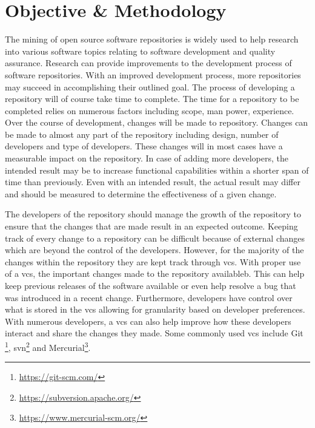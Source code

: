 \section{Objective \& Methodology}

The mining of open source software repositories is widely used to help research into various software topics relating to software development and quality assurance. Research can provide improvements to the development process of software repositories. With an improved development process, more repositories may succeed in accomplishing their outlined goal. The process of developing a repository will of course take time to complete. The time for a repository to be completed relies on numerous factors including scope, man power, experience. Over the course of development, changes will be made to repository. Changes can be made to almost any part of the repository including design, number of developers and type of developers. These changes will in most cases have a measurable impact on the repository. In case of adding more developers, the intended result may be to increase functional capabilities within a shorter span of time than previously. Even with an intended result, the actual result may differ and should be measured to determine the effectiveness of a given change.

The developers of the repository should manage the growth of the repository to ensure that the changes that are made result in an expected outcome. Keeping track of every change to a repository can be difficult because of external changes which are beyond the control of the developers. However, for the majority of the changes within the repository they are kept track through \gls{vcs}. With proper use of a \gls{vcs}, the important changes made to the repository availableb. This can help keep previous releases of the software available or even help resolve a bug that was introduced in a recent change. Furthermore, developers have control over what is stored in the \gls{vcs} allowing for granularity based on developer preferences. With numerous developers, a \gls{vcs} can also help improve how these developers interact and share the changes they made. Some commonly used \gls{vcs} include Git \footnote{\url{https://git-scm.com/}}, \gls{svn}\footnote{\url{https://subversion.apache.org/}} and Mercurial\footnote{\url{https://www.mercurial-scm.org/}}.

